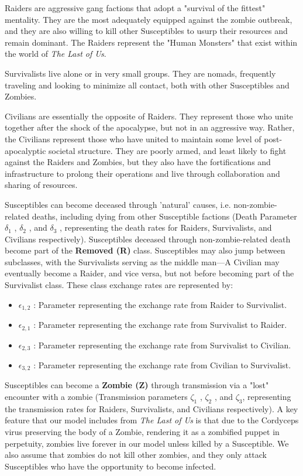 \documentclass{article}
\begin{document}
Raiders are aggressive gang factions that adopt a "survival of the fittest" mentality. They are the most adequately equipped against the zombie outbreak, and they are also willing to kill other Susceptibles to usurp their resources and remain dominant. The Raiders represent the "Human Monsters" that exist within the world of \textit{The Last of Us}.

Survivalists live alone or in very small groups. They are nomads, frequently traveling and looking to minimize all contact, both with other Susceptibles and Zombies.

Civilians are essentially the opposite of Raiders. They represent those who unite together after the shock of the apocalypse, but not in an aggressive way. Rather, the Civilians represent those who have united to maintain some level of post-apocalyptic societal structure. They are poorly armed, and least likely to fight against the Raiders and Zombies, but they also have the fortifications and infrastructure to prolong their operations and live through collaboration and sharing of resources. 

Susceptibles can become deceased through 'natural' causes, i.e. non-zombie-related deaths, including dying from other Susceptible factions (Death Parameter $\delta_1$ , $\delta_2$ , and $\delta_3$ , representing the death rates for Raiders, Survivalists, and Civilians respectively). Susceptibles deceased through non-zombie-related death become part of the \textbf{Removed (R)} class. Susceptibles may also jump between subclasses, with the Survivalists serving as the middle man—A Civilian may eventually become a Raider, and vice versa, but not before becoming part of the Survivalist class. These class exchange rates are represented by: 

\begin{itemize}
    \item $\epsilon_{1,2}$ : Parameter representing the exchange rate from Raider to Survivalist.
    \item $\epsilon_{2,1}$ : Parameter representing the exchange rate from Survivalist to Raider.
    \item $\epsilon_{2,3}$ : Parameter representing the exchange rate from Survivalist to Civilian.
    \item $\epsilon_{3,2}$ : Parameter representing the exchange rate from Civilian to Survivalist. 
\end{itemize}

Susceptibles can become a \textbf{Zombie (Z)} through transmission via a "lost" encounter with a zombie (Transmission parameters $\zeta_1$ , $\zeta_2$ , and $\zeta_3$, representing the transmission rates for Raiders, Survivalists, and Civilians respectively). A key feature that our model includes from \textit{The Last of Us} is that due to the Cordyceps virus preserving the body of a Zombie, rendering it as a zombified puppet in perpetuity, zombies live forever in our model unless killed by a Susceptible. We also assume that zombies do not kill other zombies, and they only attack Susceptibles who have the opportunity to become infected.
\end{document}
